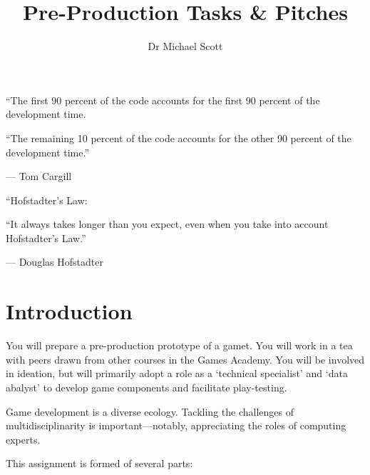 \documentclass{../../fal_assignment}
\title{Pre-Production Tasks \& Pitches}
\author{Dr Michael Scott}
\begin{document}
\maketitle

\begin{marginquote}
    ``The first 90 percent of the code accounts for the first 90 percent of the development time.
    
    ``The remaining 10 percent of the code accounts for the other 90 percent of the development time.''
    
    --- Tom Cargill
    
    \marginquoterule
    
    ``Hofstadter's Law:
    
    ``It always takes longer than you expect, even when you take into account Hofstadter's Law.''
    
    --- Douglas Hofstadter
\end{marginquote}

\section*{Introduction}

You will prepare a pre-production prototype of a gamet. You will work  in a tea with peers drawn from other courses in the Games Academy. You will be involved in ideation, but will primarily adopt a role as a `technical specialist' and `data abalyst' to develop game components and facilitate play-testing.

Game development is a diverse ecology. Tackling the challenges of multidisciplinarity is important---notably, appreciating the roles of computing experts.

This assignment is formed of several parts:
\end{document}
